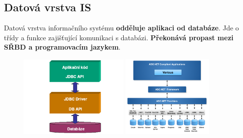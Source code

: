 \subsection{Datová vrstva IS}
Datová vrstva informačního systému \textbf{odděluje aplikaci od databáze}. Jde o třídy a funkce zajišťující komunikaci s databázi. \textbf{Překonává propast mezi SŘBD a programovacím jazykem}.

\begin{figure}[H]
	\centering
	\includegraphics[width=0.48\textwidth]{assets/jdbc.png}
	\includegraphics[width=0.4\textwidth]{assets/adonet.png}
\end{figure}

